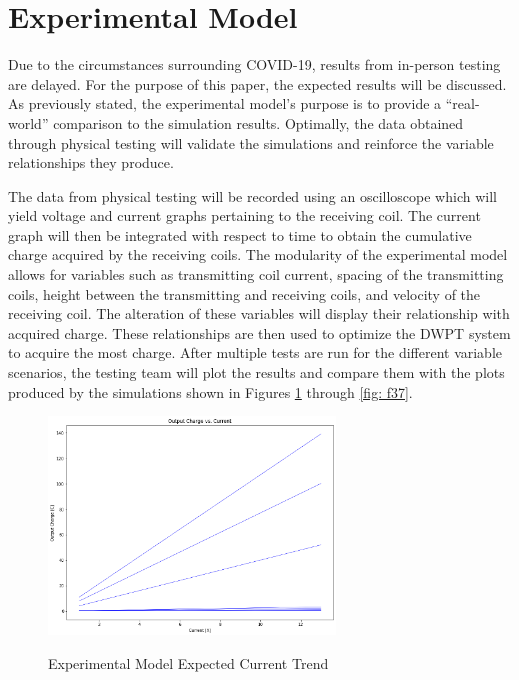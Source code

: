 \section{Experimental Model}
Due to the circumstances surrounding COVID-19, results from in-person testing are delayed. For the purpose of 
this paper, the expected results will be discussed. As previously stated, the experimental model’s purpose 
is to provide a “real-world” comparison to the simulation results. Optimally, the data obtained through 
physical testing will validate the simulations and reinforce the variable relationships they produce.

The data from physical testing will be recorded using an oscilloscope which will yield voltage and current 
graphs pertaining to the receiving coil. The current graph will then be integrated with respect to time to 
obtain the cumulative charge acquired by the receiving coils. The modularity of the experimental model 
allows for variables such as transmitting coil current, spacing of the transmitting coils, height between 
the transmitting and receiving coils, and velocity of the receiving coil. The alteration of these variables 
will display their relationship with acquired charge. These relationships are then used to optimize the DWPT 
system to acquire the most charge. After multiple tests are run for the different variable scenarios, the 
testing team will plot the results and compare them with the plots produced by the simulations shown in 
Figures \ref{fig: f34} through \ref{fig: f37}.

\begin{figure}
    \begin{center}
    \includegraphics[width=3in]{fig34.png}
    \end{center}
    \renewcommand{\baselinestretch}{1}
    \small\normalsize
    \begin{quote}
    \caption[Experimental Model Expected Current Trend]{Experimental Model Expected Current Trend} \label{fig: f34}
    \end{quote}
\end{figure}

